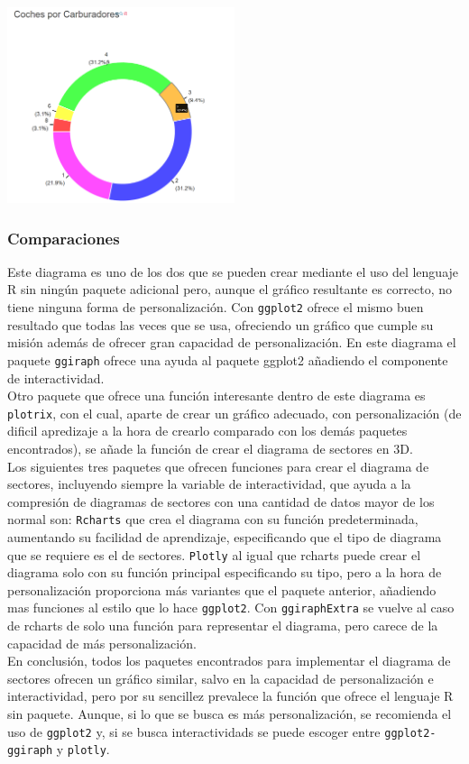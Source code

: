 \documentclass{article}\usepackage[]{graphicx}\usepackage[]{color}
\begin{document}
\vbox{
    \centering
    \includegraphics[width=0.5\textwidth]{imag/donnut}
}
\clearpage
\subsubsection{Comparaciones}
Este diagrama es uno de los dos que se pueden crear mediante el uso del lenguaje R sin ning\'un paquete adicional pero, aunque el gr\'afico resultante es correcto, no tiene ninguna forma de personalizaci\'on. Con \texttt{ggplot2} ofrece el mismo buen resultado que todas las veces que se usa, ofreciendo un gr\'afico que cumple su misi\'on adem\'as de ofrecer gran capacidad de personalizaci\'on. En este diagrama el paquete \texttt{ggiraph} ofrece una ayuda al paquete ggplot2 a\~nadiendo el componente de interactividad.~\\ Otro paquete que ofrece una funci\'on interesante dentro de este diagrama es \texttt{plotrix}, con el cual, aparte de crear un gr\'afico adecuado, con personalizaci\'on (de dificil apredizaje a la hora de crearlo comparado con los dem\'as paquetes encontrados), se a\~nade la funci\'on de crear el diagrama de sectores en 3D.~\\
Los siguientes tres paquetes que ofrecen funciones para crear el diagrama de sectores, incluyendo siempre la variable de interactividad, que ayuda a la compresi\'on de diagramas de sectores con una cantidad de datos mayor de los normal son: \texttt{Rcharts} que crea el diagrama con su funci\'on predeterminada, aumentando su facilidad de aprendizaje, especificando que el tipo de diagrama que se requiere es el de sectores. \texttt{Plotly} al igual que rcharts puede crear el diagrama solo con su funci\'on principal especificando su tipo, pero a la hora de personalizaci\'on proporciona m\'as variantes que el paquete anterior, a\~nadiendo mas funciones al estilo que lo hace \texttt{ggplot2}. Con \texttt{ggiraphExtra} se vuelve al caso de rcharts de solo una funci\'on para representar el diagrama, pero carece de la capacidad de m\'as personalizaci\'on.~\\
En conclusi\'on, todos los paquetes encontrados para implementar el diagrama de sectores ofrecen un gr\'afico similar, salvo en la capacidad de personalizaci\'on e interactividad, pero por su sencillez prevalece la funci\'on que ofrece el lenguaje R sin paquete. Aunque, si lo que se busca es m\'as personalizaci\'on, se recomienda el uso de \texttt{ggplot2} y, si se busca interactividads se puede escoger entre \texttt{ggplot2-ggiraph} y \texttt{plotly}.
\clearpage
\end{document}
